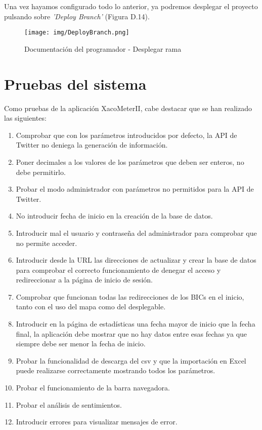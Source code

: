 Una vez hayamos configurado todo lo anterior, ya podremos desplegar el proyecto pulsando sobre \textit{'Deploy Branch'} (Figura D.14).
\begin{figure}[h!]
    \centering
    \texttt{[image: img/DeployBranch.png]} \\
    \caption{Documentación del programador - Desplegar rama}
    \label{Documentación del programador - Desplegar rama}
\end{figure}
\section{Pruebas del sistema}
Como pruebas de la aplicación XacoMeterII, cabe destacar que se han realizado las siguientes:
\begin{enumerate}
    \item Comprobar que con los parámetros introducidos por defecto, la API de Twitter no deniega la generación de información.
    \item Poner decimales a los valores de los parámetros que deben ser enteros, no debe permitirlo.
    \item Probar el modo administrador con parámetros no permitidos para la API de Twitter.
    \item No introducir fecha de inicio en la creación de la base de datos.
    \item Introducir mal el usuario y contraseña del administrador para comprobar que no permite acceder.
    \item Introducir desde la URL las direcciones de actualizar y crear la base de datos para comprobar el correcto funcionamiento de denegar el acceso y redireccionar a la página de inicio de sesión.
    \item Comprobar que funcionan todas las redirecciones de los BICs en el inicio, tanto con el uso del mapa como del desplegable.
    \item Introducir en la página de estadísticas una fecha mayor de inicio que la fecha final, la aplicación debe mostrar que no hay datos entre esas fechas ya que siempre debe ser menor la fecha de inicio.
    \item Probar la funcionalidad de descarga del csv y que la importación en Excel puede realizarse correctamente mostrando todos los parámetros.
    \item Probar el funcionamiento de la barra navegadora.
    \item Probar el análisis de sentimientos.
    \item Introducir errores para visualizar mensajes de error.

\end{enumerate}